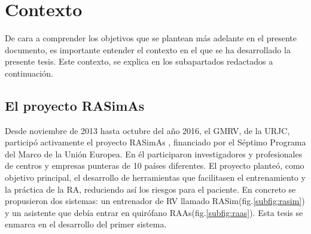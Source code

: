 

\section{Contexto}

De cara a comprender los objetivos que se plantean más adelante en el presente documento, es importante entender el contexto en el que se ha desarrollado la presente tesis. 
Este contexto, se explica en los subapartados redactados a continuación.


\subsection{El proyecto RASimAs}
\label{intro:rasimas}

Desde noviembre de 2013 hasta octubre del año 2016, el \ac{GMRV}, de la \ac{URJC}, participó activamente el proyecto \ac{RASimAs} \cite{rasimasweb}, financiado por el Séptimo Programa del Marco de la Unión Europea. En él participaron investigadores y profesionales de centros y empresas punteras de 10 países diferentes. El proyecto planteó, como objetivo principal, el desarrollo de herramientas que facilitasen el entrenamiento y la práctica de la \ac{RA}, reduciendo así los riesgos para el paciente. En concreto se propusieron dos sistemas: un entrenador de \ac{RV} llamado \ac{RASim}(fig.\ref{subfig:rasim}) y un asistente que debía entrar en quirófano \ac{RAAs}(fig.\ref{subfig:raas}). Esta tesis se enmarca en el desarrollo del primer sistema.

